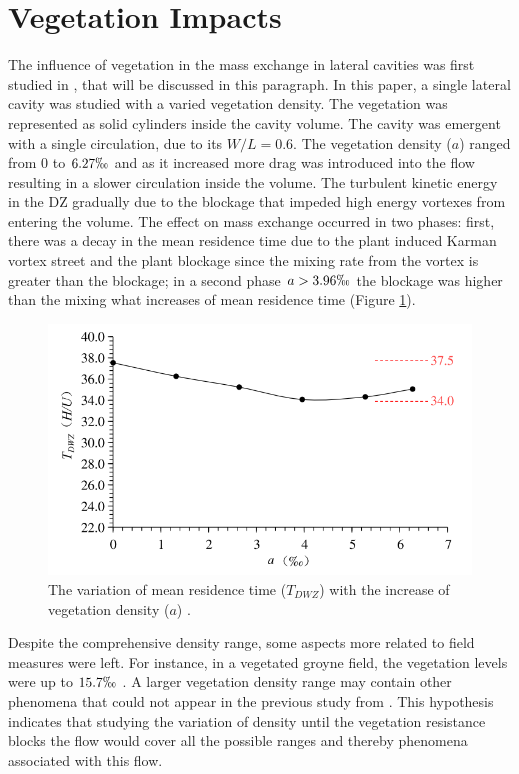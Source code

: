 \section{Vegetation Impacts}
The influence of vegetation in the mass exchange in lateral cavities was first studied in \textcite{xiang2019}, that will be discussed in this paragraph. In this paper, a single lateral cavity was studied with a varied vegetation density. The vegetation was represented as solid cylinders inside the cavity volume. The cavity was emergent with a single circulation, due to its $W/L=0.6$. The vegetation density ($a$) ranged from 0 to $6.27\permil$ and as it increased more drag was introduced into the flow resulting in a slower circulation inside the volume. The turbulent kinetic energy in the DZ gradually due to the blockage that impeded high energy vortexes from entering the volume. The effect on mass exchange occurred in two phases: first, there was a decay in the mean residence time due to the plant induced Karman vortex street and the plant blockage since the mixing rate from the vortex is greater than the blockage; in a second phase $a>3.96\permil$ the blockage was higher than the mixing what increases of mean residence time (Figure \ref{fig:xiang2019fig12}).
\begin{figure}[!ht]
\centering
\includegraphics[width=0.8\linewidth]{../images/introduction/xiang2019fig12.png}
\caption{The variation of mean residence time ($T_{DWZ}$) with the increase of vegetation density ($a$) \cite{xiang2019}.}
\label{fig:xiang2019fig12}
\end{figure}

Despite the comprehensive density range, some aspects more related to field measures were left. For instance, in a vegetated groyne field, the vegetation levels were up to $15.7\permil$ \cite{sukhodolov2017}. A larger vegetation density range may contain other phenomena that could not appear in the previous study from \textcite{xiang2019}. This hypothesis indicates that studying the variation of density until the vegetation resistance blocks the flow would cover all the possible ranges and thereby phenomena associated with this flow.

